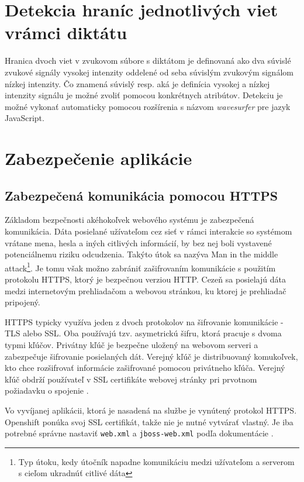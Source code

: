 \documentclass[12pt,oneside]{fithesis2}
\begin{document}
\section{Detekcia hraníc jednotlivých viet vrámci diktátu}
\par Hranica dvoch viet v zvukovom súbore s diktátom je definovaná ako dva súvislé zvukové signály vysokej intenzity oddelené od seba súvislým zvukovým signálom nízkej intenzity\cite{wavesurfer14}. Čo znamená súvislý resp. aká je definícia vysokej a nízkej intenzity signálu je možné zvoliť pomocou konkrétnych atribútov. Detekciu je možné vykonať automaticky pomocou rozšírenia s názvom \textit{wavesurfer} pre jazyk JavaScript.

      \section{Zabezpečenie aplikácie}
      		\subsection{Zabezpečená komunikácia pomocou HTTPS} \label{https}
      		\par Základom bezpečnosti akéhokoľvek webového systému je zabezpečená komunikácia. Dáta posielané užívateľom cez sieť v rámci interakcie so systémom vrátane mena, hesla a iných citlivých informácií, by bez nej boli vystavené potenciálnemu riziku odcudzenia. Takýto útok sa nazýva Man in the middle attack\footnote{Typ útoku, kedy útočník napadne komunikáciu medzi užívateľom a serverom s cieľom ukradnúť citlivé dáta}. Je tomu však možno zabrániť zašifrovaním komunikácie s použitím protokolu HTTPS, ktorý je bezpečnou verziou HTTP. Cezeň sa posielajú dáta medzi internetovým prehliadačom a webovou stránkou, ku ktorej je prehliadač pripojený. 
      		\par HTTPS typicky využíva jeden z dvoch protokolov na šifrovanie komunikácie - TLS alebo SSL. Oba používajú tzv. asymetrickú šifru, ktorá pracuje s dvoma typmi kľúčov. Privátny kľúč je bezpečne uložený na webovom serveri a zabezpečuje šifrovanie posielaných dát. Verejný kľúč je distribuovaný komukoľvek, kto chce rozšifrovať informácie zašifrované pomocou privátneho kľúča. Verejný kľúč obdrží používateľ v SSL certifikáte webovej stránky pri prvotnom požiadavku o spojenie \cite{comodo15}.
      		\par Vo vyvíjanej aplikácii, ktorá je nasadená na službe je vynútený protokol HTTPS. Openshift ponúka svoj SSL certifikát, takže nie je nutné vytvárať vlastný. Je iba potrebné správne nastaviť \texttt{web.xml} a \texttt{jboss-web.xml} podľa dokumentácie \cite{openshift15}.
      		\pagebreak
\end{document}
